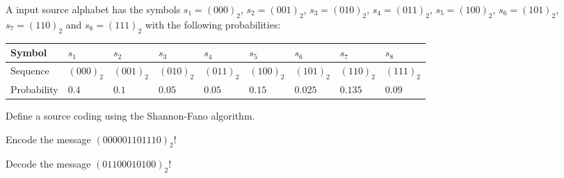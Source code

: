 \begin{question}[subtitle={Source Coding}]
	A input source alphabet has the symbols $s_1 = (000)_2$, $s_2 = (001)_2$, $s_3 = (010)_2$, $s_4 = (011)_2$, $s_5 = (100)_2$, $s_6 = (101)_2$, $s_7 = (110)_2$ and $s_8 = (111)_2$ with the following probabilities:
	\begin{table}[H]
		\centering
		\begin{tabular}{|l|l|l|l|l|l|l|l|l|}
			\hline
			Symbol & $s_1$ & $s_2$ & $s_3$ & $s_4$ & $s_5$ & $s_6$ & $s_7$ & $s_8$ \\
			\hline
			Sequence & $(000)_2$ & $(001)_2$ & $(010)_2$ & $(011)_2$ & $(100)_2$ & $(101)_2$ & $(110)_2$ & $(111)_2$ \\
			\hline
			Probability & $0.4$ & $0.1$ & $0.05$ & $0.05$ & $0.15$ & $0.025$ & $0.135$ & $0.09$ \\
			\hline
		\end{tabular}
	\end{table}

	\begin{tasks}
		\task
		Define a source coding using the Shannon-Fano algorithm.
		
		\task
		Encode the message $\left(000001101110\right)_2$!
		
		\task
		Decode the message $\left(01100010100\right)_2$!
	\end{tasks}
\end{question}

